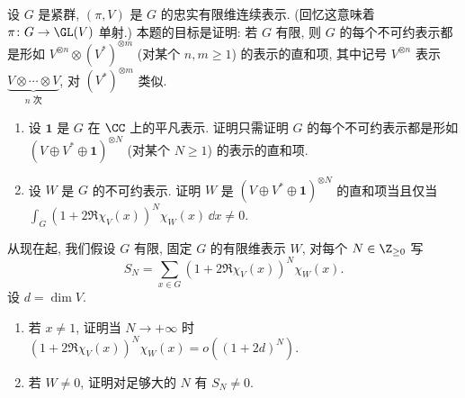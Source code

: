 \begin{exercise}
\label{ex:IV.9.2}
设 $G$ 是紧群, $(\pi, V)$ 是 $G$ 的忠实有限维连续表示. (回忆这意味着 $\pi \colon G \to \GL(V)$ 单射.) 本题的目标是证明: 若 $G$ 有限, 则 $G$ 的每个不可约表示都是形如 $V^{\otimes n} \otimes (V^*)^{\otimes m}$ (对某个 $n, m \geq 1$) 的表示的直和项, 其中记号 $V^{\otimes n}$ 表示 $\underbrace{V \otimes \cdots \otimes V}_{n \text{ 次}}$, 对 $(V^*)^{\otimes m}$ 类似.
\begin{enumerate}
\item[(a)] 设 $\mathbf{1}$ 是 $G$ 在 $\CC$ 上的平凡表示. 证明只需证明 $G$ 的每个不可约表示都是形如 $(V \oplus V^* \oplus \mathbf{1})^{\otimes N}$ (对某个 $N \geq 1$) 的表示的直和项.
\item[(b)] 设 $W$ 是 $G$ 的不可约表示. 证明 $W$ 是 $(V \oplus V^* \oplus \mathbf{1})^{\otimes N}$ 的直和项当且仅当 $\int_G (1 + 2\Re\chi_V(x))^N\chi_W(x)\,\dd x \neq 0$.
\end{enumerate}
从现在起, 我们假设 $G$ 有限, 固定 $G$ 的有限维表示 $W$, 对每个 $N \in \Z_{\geq 0}$ 写
\[
S_N = \sum_{x \in G}(1 + 2\Re\chi_V(x))^N\chi_W(x).
\]
设 $d = \dim V$.
\begin{enumerate}
\item[(c)] 若 $x \neq 1$, 证明当 $N \to +\infty$ 时 $(1 + 2\Re\chi_V(x))^N\chi_W(x) = o((1 + 2d)^N)$.
\item[(d)] 若 $W \neq 0$, 证明对足够大的 $N$ 有 $S_N \neq 0$.
\end{enumerate}
\end{exercise}

